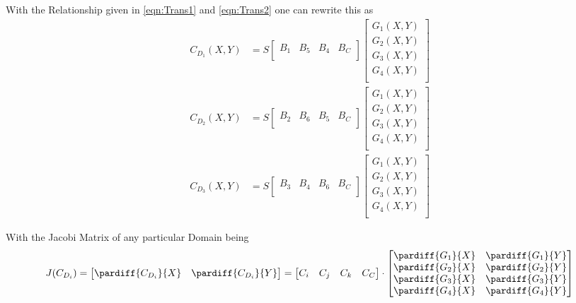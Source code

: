 \documentclass{mitschrift}
\begin{document}
With the Relationship given in \eqref{eqn:Trans1} and \eqref{eqn:Trans2} one can rewrite this as \begin{align}
    C_{D_1}(X,Y) &= S \begin{bmatrix}
        B_1 & B_5 & B_4 & B_C \\ 
    \end{bmatrix} \begin{bmatrix}
        G_1(X,Y) \\
        G_2(X,Y) \\
        G_3(X,Y) \\
        G_4(X,Y) \\
    \end{bmatrix} \\
    C_{D_2}(X,Y) &= S \begin{bmatrix}
        B_2 & B_6 & B_5 & B_C \\ 
    \end{bmatrix} \begin{bmatrix}
        G_1(X,Y) \\
        G_2(X,Y) \\
        G_3(X,Y) \\
        G_4(X,Y) \\
    \end{bmatrix} \\
    C_{D_3}(X,Y) &= S \begin{bmatrix}
        B_3 & B_4 & B_6 & B_C \\ 
    \end{bmatrix} \begin{bmatrix}
        G_1(X,Y) \\
        G_2(X,Y) \\
        G_3(X,Y) \\
        G_4(X,Y) \\
    \end{bmatrix}
\end{align}

With the Jacobi Matrix of any particular Domain being \begin{equation}
    J(C_{D_i}) = \begin{bmatrix}
        \pardiff{C_{D_i}}{X} & \pardiff{C_{D_i}}{Y} \\ 
    \end{bmatrix} = \begin{bmatrix}
        C_i & C_j & C_k & C_C \\ 
    \end{bmatrix}\cdot \begin{bmatrix}
        \pardiff{G_1}{X} & \pardiff{G_1}{Y} \\  
        \pardiff{G_2}{X} & \pardiff{G_2}{Y} \\
        \pardiff{G_3}{X} & \pardiff{G_3}{Y} \\
        \pardiff{G_4}{X} &\pardiff{G_4}{Y} \\
    \end{bmatrix}
\end{equation}
\end{document}
